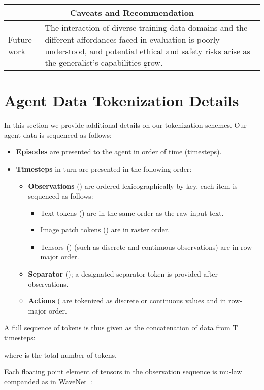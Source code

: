 \documentclass[10pt]{article} \usepackage[accepted]{tmlr}
\begin{document}
\begin{longtable}{p{}|p{}}
\toprule
\multicolumn{2}{c}{\textbf{Caveats and Recommendation}}\\
\midrule
Future work & The interaction of diverse training data domains and the different affordances faced in evaluation is poorly understood, and potential ethical and safety risks arise as the generalist's capabilities grow. \\

\bottomrule

\end{longtable} \newpage

\section{Agent Data Tokenization Details}
\label{sec:tokenization_appendix}
In this section we provide additional details on our tokenization schemes.
Our agent data is sequenced as follows:
\begin{itemize}
    \item \textbf{Episodes} are presented to the agent in order of time (timesteps).
    \item \textbf{Timesteps} in turn are presented in the following order:
    \begin{itemize}
        \item \textbf{Observations} () are ordered lexicographically by key, each item is sequenced as follows:
        \begin{itemize}
            \item Text tokens () are in the same order as the raw input text.
            \item Image patch tokens  () are in raster order.
            \item Tensors () (such as discrete and continuous observations) are in row-major order.
        \end{itemize}
        \item \textbf{Separator} (); a designated separator token is provided after observations.
        \item \textbf{Actions} ( are tokenized as discrete or continuous values and in row-major order.
    \end{itemize}
\end{itemize}
A full sequence of tokens is thus given as the concatenation of data from T timesteps: 

where  is the total number of tokens. 

Each floating point element of tensors in the observation sequence is mu-law companded as in WaveNet~\citep{oord2016wavenet}:
\end{document}
